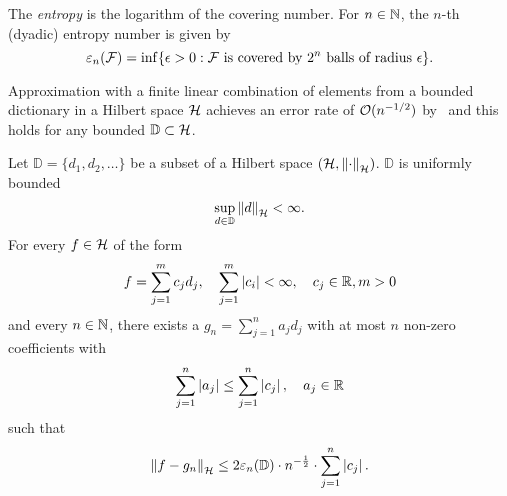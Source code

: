 \begin{definition}[Entropy]
    \label{def:entropy} The \textit{entropy} is the logarithm of the covering
    number. For $n \in \mathbb{N}$, the $n$-th (dyadic) entropy number is given by
    \begin{equation}
        \varepsilon_{n}({\mathcal{F}})
        = \inf \{
            \epsilon > 0: \mathcal{F} \text{ is covered by } 2^n 
            \text{ balls of radius } \epsilon
        \}.
    \end{equation}
\end{definition}

Approximation with a finite linear combination of elements from a bounded
dictionary in a Hilbert space $\mathcal{H}$ achieves an error rate of
$\mathcal{O}(n^{-1/2})$ by~\cite{pisierRemarquesResultatNon1980} and this holds for
any bounded $\mathbb{D} \subset \mathcal{H}$.

\begin{theorem}
    \label{thm:maurey}
    Let $\mathbb{D} = \{d_1, d_2, \dots\}$ be a subset of a Hilbert space
    $(\mathcal{H}, \left\| \cdot \right\|_{\mathcal{H}})$. $\mathbb{D}$ is uniformly bounded
    \begin{equation}
        \sup_{d\in\mathbb{D}} \left\| d \right\|_{\mathcal{H}} < \infty.
    \end{equation}
    For every $f \in \mathcal{H}$ of the form
    \begin{equation}
        \label{eq:maurey_eq_1}
        f = \sum_{j=1}^m c_j d_j, \quad
        \sum_{j=1}^m \left| c_i \right| < \infty, \quad
        c_j \in \mathbb{R}, m > 0
    \end{equation}
    and every $n \in \mathbb{N}$, there exists a $g_n = \sum_{j=1}^n a_j
    d_j$ with at most $n$ non-zero coefficients with
    \begin{equation}
        \sum_{j=1}^n \left| a_j \right| \leq
        \sum_{j=1}^n \left| c_j \right|, 
        \quad a_j \in \mathbb{R}
    \end{equation}
    such that
    \begin{equation}
        \left\| f - g_n \right\|_{\mathcal{H}} \leq
        2 \varepsilon_{n}({\mathbb{D}})
        \cdot n^{-\frac{1}{2}}
        \cdot \sum_{j=1}^n \left| c_j \right|.
    \end{equation}

\end{theorem}

